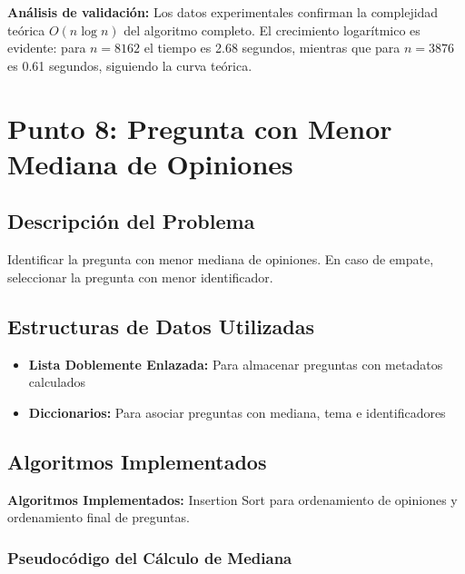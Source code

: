 \documentclass[11pt,a4paper]{article}
\begin{document}
\textbf{Análisis de validación:} Los datos experimentales confirman la complejidad teórica $O(n \log n)$ del algoritmo completo. El crecimiento logarítmico es evidente: para $n = 8162$ el tiempo es 2.68 segundos, mientras que para $n = 3876$ es 0.61 segundos, siguiendo la curva teórica.

\section{Punto 8: Pregunta con Menor Mediana de Opiniones}

\subsection{Descripción del Problema}
Identificar la pregunta con menor mediana de opiniones. En caso de empate, seleccionar la pregunta con menor identificador.

\subsection{Estructuras de Datos Utilizadas}
\begin{itemize}[label=\textbullet]
\item \textbf{Lista Doblemente Enlazada:} Para almacenar preguntas con metadatos calculados
\item \textbf{Diccionarios:} Para asociar preguntas con mediana, tema e identificadores
\end{itemize}

\subsection{Algoritmos Implementados}

\textbf{Algoritmos Implementados:} Insertion Sort para ordenamiento de opiniones y ordenamiento final de preguntas.

\subsubsection{Pseudocódigo del Cálculo de Mediana}
\end{document}
